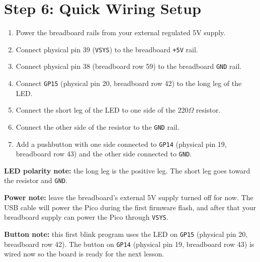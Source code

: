 \documentclass[11pt,letterpaper]{article}
\begin{document}
\section*{Step 6: Quick Wiring Setup}
\begin{enumerate}
    \item Power the breadboard rails from your external regulated 5V supply.
    \item Connect physical pin 39 (\texttt{VSYS}) to the breadboard \texttt{+5V} rail.
    \item Connect physical pin 38 (breadboard row 59) to the breadboard \texttt{GND} rail.
    \item Connect \texttt{GP15} (physical pin 20, breadboard row 42) to the long leg of the LED.
    \item Connect the short leg of the LED to one side of the 220$\Omega$ resistor.
    \item Connect the other side of the resistor to the \texttt{GND} rail.
    \item Add a pushbutton with one side connected to \texttt{GP14} (physical pin 19, breadboard row 43) and the other side connected to \texttt{GND}.
\end{enumerate}

\textbf{LED polarity note:} the long leg is the positive leg. The short leg goes toward the resistor and \texttt{GND}.

\textbf{Power note:} leave the breadboard's external 5V supply turned off for now. The USB cable will power the Pico during the first firmware flash, and after that your breadboard supply can power the Pico through \texttt{VSYS}.

\textbf{Button note:} this first blink program uses the LED on \texttt{GP15} (physical pin 20, breadboard row 42). The button on \texttt{GP14} (physical pin 19, breadboard row 43) is wired now so the board is ready for the next lesson.
\end{document}
